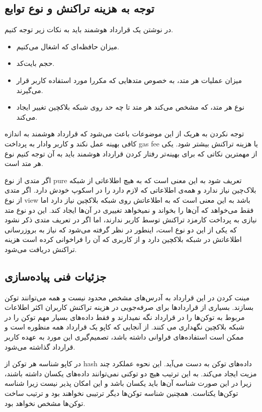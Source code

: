 \subsection{توجه به هزینه تراکنش و نوع توابع}
در نوشتن یک قرارداد هوشمند باید به نکات زیر توجه کنیم.
\begin{itemize}
  \item
میزان حافظه‌ای که اشغال می‌کنیم.
  \item
حجم بایت‌کد.
  \item
میزان عملیات هر متد، به خصوص متدهایی که مکررا مورد استفاده کاربر قرار می‌گیرند.
  \item
نوع هر متد، که مشخص می‌کند هر متد تا چه حد روی شبکه بلاکچین تغییر ایجاد می‌کند.
\end{itemize}

توجه نکردن به هریک از این موضوعات باعث می‌شود که قرارداد هوشمند به اندازه کافی بهینه عمل نکند و کاربر وادار به پرداخت gas fee یا هزینه تراکنش بیشتر شود. یکی از مهمترین نکاتی که برای بهینه‌تر رفتار کردن قرارداد هوشمند باید به آن توجه کنیم نوع هر متد است.

اگر متدی از نوع pure تعریف شود به این معنی است که به هیچ اطلاعاتی از شبکه بلاک‌چین نیاز ندارد و همه‌ی اطلاعاتی که لازم دارد را در اسکوپ
خودش دارد. اگر متدی از نوع view باشد به این معنی است که به اطلاعاتش روی شبکه بلاکچین نیاز دارد اما فقط می‌خواهد که آن‌ها را بخواند و نمیخواهد تغییری در آن‌ها ایجاد کند. این دو نوع متد نیازی به پرداخت کارمزد تراکنش توسط کاربر ندارند، اما اگر در تعریف متدی ذکر نشود که یکی از این دو نوع است، اینطور در نظر گرفته می‌شود که نیاز به بروزرسانی اطلاعاتش در شبکه بلاکچین دارد و از کاربری که آن را فراخوانی کرده است هزینه تراکنش دریافت می‌شود.


\subsection{جزئیات فنی پیاده‌سازی}
مینت کردن در این قرارداد به آدرس‌های مشخص محدود نیست و همه می‌توانند توکن بسازند. بسیاری از قراردادها برای صرفه‌جویی در هزینه تراکنش کاربران اکثر اطلاعات مربوط به توکن‌ها را در قرارداد نگه نمیدارند و فقط داده‌های بسیار مهم توکن را در شبکه بلاکچین نگهداری می کنند. از آنجایی که کاپو یک قرارداد همه منظوره است و ممکن است استفاده‌های فراوانی داشته باشد، تصمیم‌گیری این مورد به عهده کاربر قرارداد گذاشته می‌شود.

در کاپو شناسه هر توکن از hash داده‌های توکن به دست می‌آید. این نحوه عملکرد چند مزیت ایجاد می‌کند. به این ترتیب هیچ دو توکنی نمی‌توانند داده‌های یکسان داشته باشند، زیرا در این صورت شناسه آن‌ها باید یکسان باشد و این امکان پذیر نیست زیرا شناسه توکن‌ها یکتاست. همچنین شناسه توکن‌ها دیگر ترتیبی نخواهند بود و ترتیب ساخت توکن‌ها مشخص نخواهد بود.

